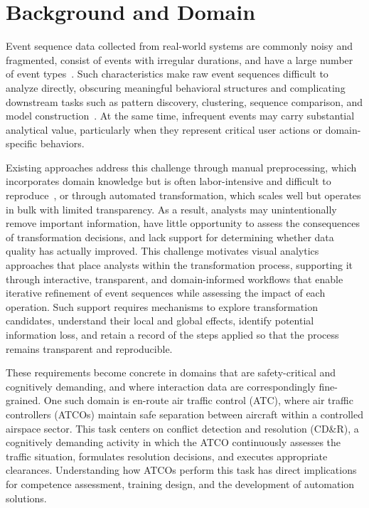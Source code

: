 \section{Background and Domain}

Event sequence data collected from real-world systems are commonly noisy and fragmented, consist of events with irregular durations, and have a large number of event types~\cite{guo2022survey}.
Such characteristics make raw event sequences difficult to analyze directly, obscuring meaningful behavioral structures and complicating downstream tasks such as pattern discovery, clustering, sequence comparison, and model construction~\cite{kandel2011research, endel2015data, furche2016data}.
At the same time, infrequent events may carry substantial analytical value, particularly when they represent critical user actions or domain-specific behaviors.

Existing approaches address this challenge through manual preprocessing, which incorporates domain knowledge but is often labor-intensive and difficult to reproduce~\cite{shneiderman2019interactive}, or through automated transformation, which scales well but operates in bulk with limited transparency.
As a result, analysts may unintentionally remove important information, have little opportunity to assess the consequences of transformation decisions, and lack support for determining whether data quality has actually improved.
This challenge motivates visual analytics approaches that place analysts within the transformation process, supporting it through interactive, transparent, and domain-informed workflows that enable iterative refinement of event sequences while assessing the impact of each operation.
Such support requires mechanisms to explore transformation candidates, understand their local and global effects, identify potential information loss, and retain a record of the steps applied so that the process remains transparent and reproducible.

These requirements become concrete in domains that are safety-critical and cognitively demanding, and where interaction data are correspondingly fine-grained.
One such domain is en-route air traffic control (ATC), where air traffic controllers (ATCOs) maintain safe separation between aircraft within a controlled airspace sector.
This task centers on conflict detection and resolution (CD\&R), a cognitively demanding activity in which the ATCO continuously assesses the traffic situation, formulates resolution decisions, and executes appropriate clearances.
Understanding how ATCOs perform this task has direct implications for competence assessment, training design, and the development of automation solutions.

